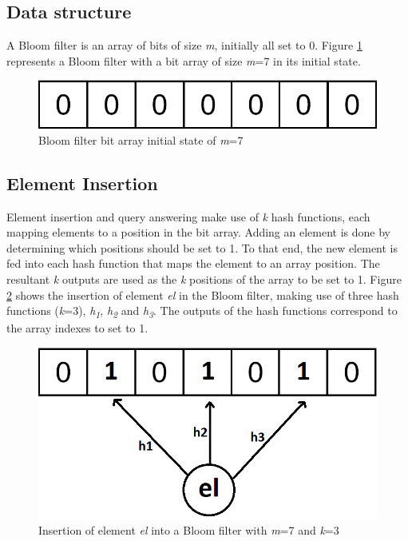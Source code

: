 \subsection*{Data structure}
A Bloom filter is an array of bits of size \textit{m}, initially all set to 0. Figure \ref{fig:initial-bloom-filter} represents a Bloom filter with a bit array of size \textit{m}=7 in its initial state.

\begin{figure}[!htb]
    \begin{center}
      \includegraphics[scale=0.9]{figures/initial-bloom.png}
      \caption[Bloom filter initial state]{Bloom filter bit array initial state of \textit{m}=7}
      \label{fig:initial-bloom-filter}
    \end{center}
\end{figure}

\subsection*{Element Insertion}
Element insertion and query answering make use of \textit{k} hash functions, each mapping elements to a position in the bit array. Adding an element is done by determining which positions should be set to 1. To that end, the new element is fed into each hash function that maps the element to an array position. The resultant \textit{k} outputs are used as the \textit{k} positions of the array to be set to 1. Figure \ref{fig:insertion-bloom-filter} shows the insertion of element \textit{el} in the Bloom filter, making use of three hash functions (\textit{k}=3), \textit{h\textsubscript{1}}, \textit{h\textsubscript{2}} and \textit{h\textsubscript{3}}. The outputs of the hash functions correspond to the array indexes to set to 1.

\begin{figure}[!htb]
    \begin{center}
      \includegraphics[scale=0.3]{figures/insert-bloom.png}
      \caption[Bloom filter insertion]{Insertion of element \textit{el} into a Bloom filter with \textit{m}=7 and \textit{k}=3}
      \label{fig:insertion-bloom-filter}
    \end{center}
\end{figure}


